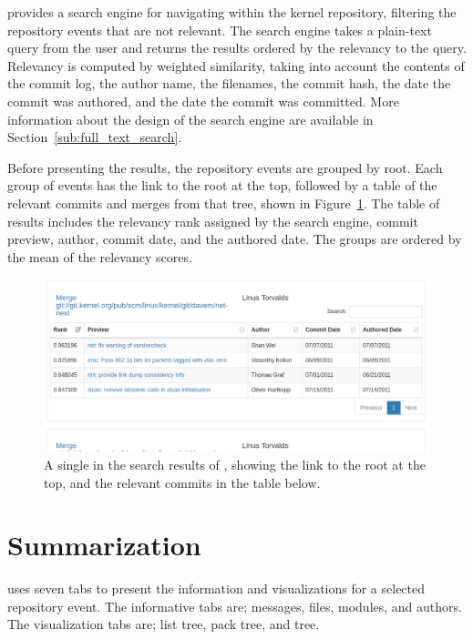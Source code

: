 
\tool{} provides a search engine for navigating within the kernel
repository, filtering the repository events that are not relevant. The
search engine takes a plain-text query from the user and returns the
results ordered by the relevancy to the query. Relevancy is computed by
weighted similarity, taking into account the contents of the commit log,
the author name, the filenames, the commit hash, the date the commit was
authored, and the date the commit was committed. More information about
the design of the search engine are available in
Section~\ref{sub:full_text_search}.

Before presenting the results, the repository events are grouped by
\mt{} root. Each group of events has the link to the root at the
top, followed by a table of the relevant commits and merges from that
tree, shown in Figure~\ref{fig:linvis_search_results}. The table of
results includes the relevancy rank assigned by the search engine,
commit preview, author, commit date, and the authored date. The
\mt{} groups are ordered by the mean of the relevancy scores.

\begin{figure}[htpb]
  \centering
  \includegraphics[width=0.9\linewidth]{Figures/Linvis/search_results.png}
  \caption{A single \mt{} in the search results of \tool{}, showing
    the link to the root at the top, and the relevant commits in the
    table below.}
  \label{fig:linvis_search_results}
\end{figure}

\section{Summarization}\label{sec:summarization}

\tool{} uses seven tabs to present the information and visualizations
for a selected repository event. The informative tabs are; messages,
files, modules, and authors. The visualization tabs are; list tree, pack
tree, and \rt{} tree.

